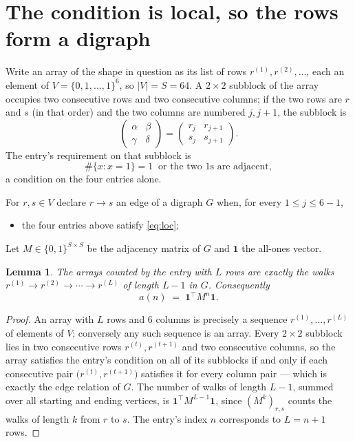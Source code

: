 \documentclass[11pt,a4paper]{article}
\theoremstyle{plain}
\newtheorem{lemma}[theorem]{Lemma}
\theoremstyle{definition}
\begin{document}
\section{The condition is local, so the rows form a digraph}

Write an array of the shape in question as its list of rows
$r^{(1)},r^{(2)},\dots$, each an element of
$V=\{0,1,\dots,1\}^{6}$, so $|V|=S=64$. A $2\times2$ subblock of the array
occupies two consecutive rows and two consecutive columns; if the two rows are $r$
and $s$ (in that order) and the two columns are numbered $j,j+1$,
the subblock is
\[
\begin{pmatrix}\alpha&\beta\\\gamma&\delta\end{pmatrix}=\begin{pmatrix}r_j&r_{j+1}\\s_j&s_{j+1}\end{pmatrix}.
\]
The entry's requirement on that subblock is
\begin{equation}\label{eq:loc}
\#\{x:x=1\}=1\ \text{ or the two }1\text{s are adjacent},
\end{equation}
a condition on the four entries alone.

For $r,s\in V$ declare $r\to s$ an edge of a digraph $G$ when, for every
$1\le j\le 6-1$,
\begin{itemize}
\item the four entries above satisfy \eqref{eq:loc};

\end{itemize}
Let $M\in\{0,1\}^{S\times S}$ be the adjacency matrix of $G$ and $\mathbf{1}$ the
all-ones vector.

\begin{lemma}\label{lem:walk}
The arrays counted by the entry with $L$ rows are exactly the walks
$r^{(1)}\to r^{(2)}\to\cdots\to r^{(L)}$ of length $L-1$ in $G$. Consequently
\[
a(n)\;=\;\mathbf{1}^{\!\top}M^{n}\mathbf{1} .
\]
\end{lemma}

\begin{proof}
An array with $L$ rows and $6$ columns is precisely a sequence
$r^{(1)},\dots,r^{(L)}$ of elements of $V$; conversely any such sequence is an array.
Every $2\times2$ subblock lies in two consecutive rows $r^{(t)},r^{(t+1)}$ and two
consecutive columns, so the array satisfies the entry's condition on all of its subblocks
if and only if each consecutive pair $\bigl(r^{(t)},r^{(t+1)}\bigr)$ satisfies it for
every column pair --- which is exactly the edge relation of $G$. The number of walks of
length $L-1$, summed over all starting and ending vertices, is
$\mathbf{1}^{\!\top}M^{L-1}\mathbf{1}$, since $(M^{k})_{r,s}$ counts the walks of
length $k$ from $r$ to $s$. The entry's index $n$ corresponds to $L=n+1$ rows.
\end{proof}
\end{document}
